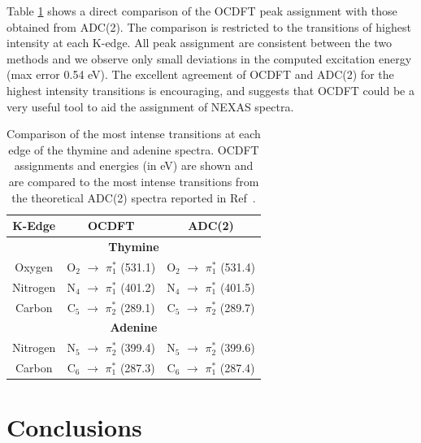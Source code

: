 \documentclass[12pt]{article}
\begin{document}
Table \ref{table: assignment_comparison} shows a direct comparison of the OCDFT peak assignment with those obtained from ADC(2).
The comparison is restricted to the transitions of highest intensity at each K-edge. All peak assignment are consistent between the two methods and we observe only small deviations in the computed excitation energy (max error 0.54 eV).
The excellent agreement of OCDFT and ADC(2) for the highest intensity transitions is encouraging, and suggests that OCDFT could be a very useful tool to aid the assignment of NEXAS spectra.
\begin{table}
\caption{Comparison of the most intense transitions at each edge of the thymine and adenine spectra. OCDFT assignments and energies (in eV) are shown and are compared to the most intense transitions from the theoretical ADC(2) spectra reported in Ref~.}
\small
\centering
\begin{tabular}{ccc}
\hline
\hline
K-Edge & OCDFT & ADC(2) \\
\hline
\multicolumn{3}{c}{\bf Thymine} \\
Oxygen  & O$_2$ $\rightarrow$ $\pi^*_1$ (531.1) &  O$_2$ $\rightarrow$ $\pi^*_1$ (531.4)  \\
Nitrogen  & N$_4$ $\rightarrow$ $\pi^*_1$ (401.2) & N$_4$ $\rightarrow$ $\pi^*_1$ (401.5) \\
Carbon  & C$_5$ $\rightarrow$ $\pi^*_2$ (289.1) & C$_5$ $\rightarrow$ $\pi^*_2$ (289.7) 
\\[2pt]
\multicolumn{3}{c}{\bf Adenine} \\
Nitrogen &  N$_5$ $\rightarrow$ $\pi^*_2$ (399.4) & N$_5$ $\rightarrow$ $\pi^*_2$ (399.6) \\
Carbon  & C$_6$ $\rightarrow$ $\pi^*_1$ (287.3) & C$_6$ $\rightarrow$ $\pi^*_1$ (287.4)\\[2pt]
\hline
\hline
\end{tabular}
\label{table: assignment_comparison}
\end{table}

\section{Conclusions}

\end{document}
